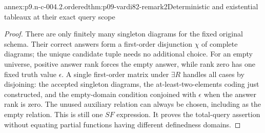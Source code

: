 \begin{annexitem}{annex:p9.n-c-004.2.ordered}{thm:p09-vardi82-remark2}{Deterministic and existential tableaux at their exact query scope}
\begin{proof}
There are only finitely many singleton diagrams for the fixed original
schema. Their correct answers form a first-order disjunction \(\chi\)
of complete diagrams; the unique candidate tuple needs no additional
choice. For an empty universe, positive answer rank forces the empty
answer, while rank zero has one fixed truth value \(\epsilon\). A
single first-order matrix under \(\exists R\) handles all cases by
disjoining: the accepted singleton diagrams, the at-least-two-elements
coding just constructed, and the empty-domain condition conjoined with
\(\epsilon\) when the answer rank is zero. The unused auxiliary
relation can always be chosen, including as the empty relation. This
is still one \(SF\) expression. It proves the total-query assertion
without equating partial functions having different definedness domains.

\end{proof}
\end{annexitem}

